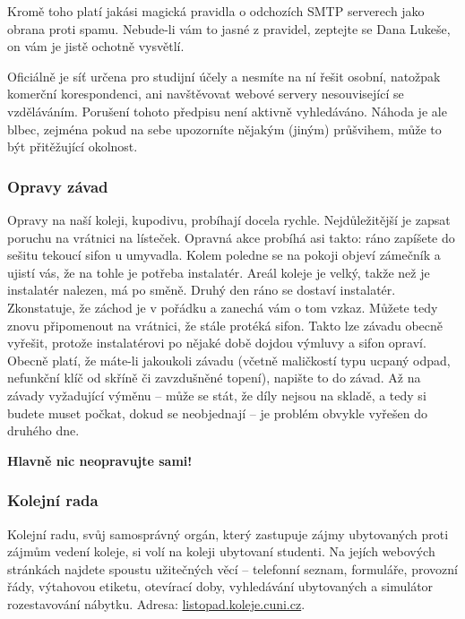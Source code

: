 Kromě toho platí jakási magická pravidla o odchozích SMTP serverech jako obrana
proti spamu. Nebude-li vám to jasné z pravidel, zeptejte se Dana Lukeše, on vám
je jistě ochotně vysvětlí.

Oficiálně je síť určena pro studijní účely a nesmíte na ní řešit osobní,
natožpak komerční korespondenci, ani navštěvovat webové servery nesouvisející se
vzděláváním. Porušení tohoto předpisu není aktivně vyhledáváno. Náhoda je ale
blbec, zejména pokud na sebe upozorníte nějakým (jiným) průšvihem, může to být
přitěžující okolnost.


\subsubsection{Opravy závad}
Opravy na naší koleji, kupodivu, probíhají docela rychle. Nejdůležitější je
zapsat poruchu na vrátnici na lísteček. Opravná akce probíhá asi takto: ráno
zapíšete do sešitu tekoucí sifon u umyvadla. Kolem poledne se na pokoji objeví
zámečník a ujistí vás, že na tohle je potřeba instalatér. Areál koleje je velký,
takže než je instalatér nalezen, má po směně. Druhý den ráno se dostaví
instalatér. Zkonstatuje, že záchod je v pořádku a zanechá vám o tom vzkaz.
Můžete tedy znovu připomenout na vrátnici, že stále protéká sifon. Takto lze
závadu obecně vyřešit, protože instalatérovi po nějaké době dojdou výmluvy a
sifon opraví. Obecně platí, že máte-li jakoukoli závadu (včetně maličkostí typu
ucpaný odpad, nefunkční klíč od skříně či zavzdušněné topení), napište to do
závad. Až na závady vyžadující výměnu – může se stát, že díly nejsou na skladě,
a tedy si budete muset počkat, dokud se neobjednají – je problém obvykle vyřešen
do druhého dne.

\textbf{Hlavně nic neopravujte sami!}


\subsubsection{Kolejní rada}
Kolejní radu, svůj samosprávný orgán, který zastupuje zájmy ubytovaných proti
zájmům vedení koleje, si volí na koleji ubytovaní studenti. Na jejích webových
stránkách najdete spoustu užitečných věcí – telefonní seznam, formuláře,
provozní řády, výtahovou etiketu, otevírací doby, vyhledávání ubytovaných a
simulátor rozestavování nábytku. Adresa: \url{listopad.koleje.cuni.cz}.


